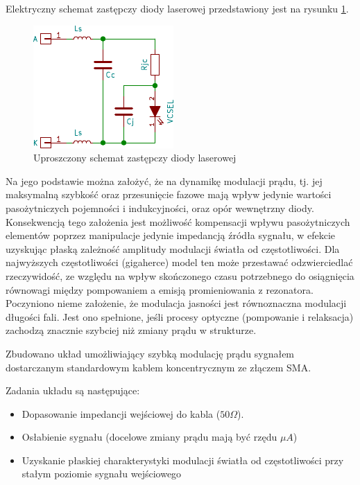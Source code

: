 \documentclass[a4paper,10pt]{article}
\begin{document}
Elektryczny schemat zastępczy diody laserowej przedstawiony jest na rysunku \ref{sch-mod1}. 
\begin{figure}
\begin{center}
 \includegraphics{./obrazki/sch_mod1.pdf}
\end{center}
\caption{Uproszczony schemat zastępczy diody laserowej}
\label{sch-mod1}
\end{figure}
Na jego podstawie można założyć, że na dynamikę modulacji prądu, tj. jej maksymalną szybkość oraz przesunięcie fazowe mają wpływ jedynie wartości pasożytniczych pojemności i indukcyjności, oraz opór wewnętrzny diody. Konsekwencją tego założenia jest możliwość kompensacji wpływu pasożytniczych elementów poprzez manipulacje jedynie impedancją źródła sygnału, w efekcie uzyskując płaską zależność amplitudy modulacji światła od częstotliwości.
Dla najwyższych częstotliwości (gigaherce) model ten może przestawać odzwierciedlać rzeczywidość, ze względu na wpływ skończonego czasu potrzebnego do osiągnięcia równowagi między pompowaniem a emisją promieniowania z rezonatora. Poczyniono nieme założenie, że modulacja jasności jest równoznaczna modulacji długości fali. Jest ono spełnione, jeśli procesy optyczne (pompowanie i relaksacja) zachodzą znacznie szybciej niż zmiany prądu w strukturze.

Zbudowano układ umożliwiający szybką modulację prądu sygnałem dostarczanym standardowym kablem koncentrycznym ze złączem SMA.

Zadania układu są następujące:
\begin{itemize}
 \item Dopasowanie impedancji wejściowej do kabla ($50 \Omega$).
 \item Osłabienie sygnału (docelowe zmiany prądu mają być rzędu $\mu A$)
 \item Uzyskanie płaskiej charakterystyki modulacji światła od częstotliwości przy stałym poziomie sygnału wejściowego
\end{itemize}
\end{document}
